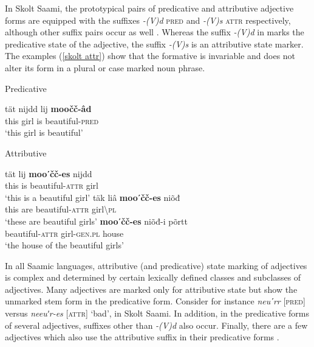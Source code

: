 In Skolt Saami, the prototypical pairs of predicative and attributive adjective forms are equipped with the suffixes \textit{-(V)d} \textsc{pred} and \textit{-(V)s} \textsc{attr} respectively, although other suffix pairs occur as well \citep[173–176]{feist2015a}. Whereas the suffix \textit{-(V)d} in  marks the predicative state of the adjective, the suffix \mbox{\textit{-(V)s}} is an attributive state marker. The examples (\ref{skolt attr}) show that the formative is invariable and does not alter its form in a plural or case marked noun phrase.
\begin{exe}
\begin{xlist}
\ex
\label{skolt pred}
{\rm Predicative}
\begin{xlist}
\gll	tät nijdd lij \textbf{moočč-âd}\\
	this girl is beautiful-\textsc{pred}\\
\glt	‘this girl is beautiful’
\end{xlist}
\ex
\label{skolt attr}
{\rm Attributive} 
\begin{xlist}
\ex
\gll 	tät lij \textbf{mooʹčč-es} nijdd\\
	this is beautiful-\textsc{attr} girl\\
\glt	‘this is a beautiful girl’
\ex	
\gll	täk liâ \textbf{mooʹčč-es} niõđ\\
	this are beautiful-\textsc{attr} girl\textbackslash\textsc{pl}\\
\glt	‘these are beautiful girls’
\ex	
\gll	\textbf{mooʹčč-es} niõđ-i põrtt\\
	beautiful-\textsc{attr} girl-\textsc{gen.pl} house\\
\glt	‘the house of the beautiful girls’
\end{xlist}
\end{xlist}
\end{exe}
In all Saamic languages, attributive (and predicative) state marking of adjectives is complex and determined by certain lexically defined classes and subclasses of adjectives. Many adjectives are marked only for attributive state but show the unmarked stem form in the predicative form. Consider for instance \textit{neuʹrr} [\textsc{pred}] versus \textit{neeuʹr-es} [\textsc{attr}] ‘bad’, in Skolt Saami. In addition, in the predicative forms of several adjectives, suffixes other than \textit{-(V)d} also occur. Finally, there are a few adjectives which also use the attributive suffix in their predicative forms \citep[cf.][173–176]{feist2015a}.

